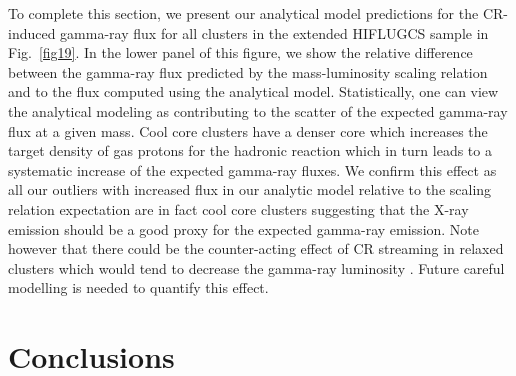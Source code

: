 \documentclass[10pt,aps,pra,reprint,amsmath,amsfonts,amssymb,showpacs,nofootinbib,floatfix]{revtex4-1}
\begin{document}
To complete this section, we present our analytical model predictions
for the CR-induced gamma-ray flux for all clusters in the extended
HIFLUGCS sample in Fig.~\ref{fig19}. In the lower panel of this
figure, we show the relative difference between the gamma-ray flux
predicted by the mass-luminosity scaling relation and to the flux
computed using the analytical model. Statistically, one can view the
analytical modeling as contributing to the scatter of the expected
gamma-ray flux at a given mass. Cool core clusters have a denser core
which increases the target density of gas protons for the hadronic
reaction which in turn leads to a systematic increase of the expected
gamma-ray fluxes. We confirm this effect as all our outliers with
increased flux in our analytic model relative to the scaling relation
expectation are in fact cool core clusters suggesting that the X-ray
emission should be a good proxy for the expected gamma-ray
emission. Note however that there could be the counter-acting effect
of CR streaming in relaxed clusters which would tend to decrease the
gamma-ray luminosity \cite{2011A&A...527A..99E}. Future careful
modelling is needed to quantify this effect.


\section{Conclusions}
\end{document}
